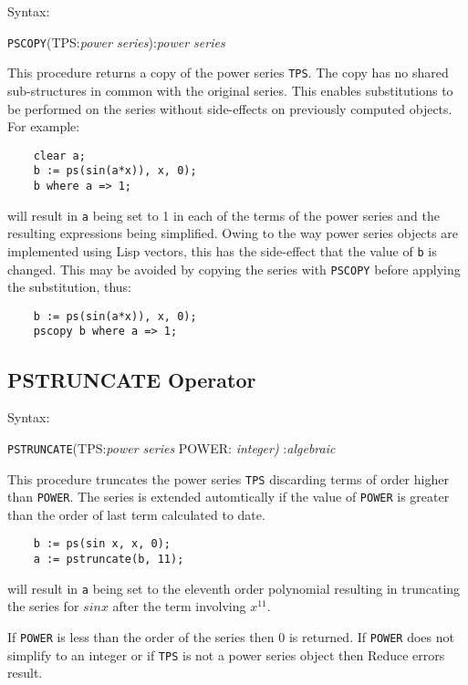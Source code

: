 Syntax:

\hspace*{2em} {\tt PSCOPY}(TPS:{\em power series}):{\em power series}

This procedure returns a copy of the power series {\tt TPS}. The copy
has no shared sub-structures in common with the original series.  This
enables substitutions to be performed on the series without
side-effects on previously computed objects. For example:

\begin{verbatim}
    clear a;
    b := ps(sin(a*x)), x, 0);
    b where a => 1;
\end{verbatim}

will result in {\tt a} being set to 1 in each of the terms of the
power series and the resulting expressions being simplified. Owing to
the way power series objects are implemented using Lisp vectors, this
has the side-effect that the value of {\tt b} is changed.  This may be
avoided by copying the series with {\tt PSCOPY} before applying the
substitution, thus:

\begin{verbatim}
    b := ps(sin(a*x)), x, 0);
    pscopy b where a => 1;
\end{verbatim}

\subsection{PSTRUNCATE Operator}

Syntax:

\hspace*{2em} {\tt PSTRUNCATE}(TPS:{\em power series} POWER: {\em integer)}
:{\em algebraic}

This procedure truncates the power series {\tt TPS} discarding terms
of order higher than {\tt POWER}. The series is extended automtically
if the value of {\tt POWER} is greater than the order of last term
calculated to date.

\begin{verbatim}
    b := ps(sin x, x, 0);
    a := pstruncate(b, 11);
\end{verbatim}

will result in {\tt a} being set to the eleventh order polynomial
resulting in truncating the series for $sin x$ after the term
involving $x^{11}$. 

If {\tt POWER} is less than the order of the series then $0$ is
returned.  If {\tt POWER} does not simplify to an integer or if 
{\tt TPS} is not a power series object then Reduce errors result.

